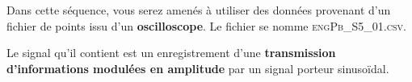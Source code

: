

Dans cette séquence, vous serez amenés à utiliser des données provenant d'un fichier de points issu d'un \textbf{oscilloscope}. Le fichier se nomme \mbox{\textsc{engPb\_S5\_01.csv}}.

Le signal qu'il contient est un enregistrement d'une \textbf{transmission d'informations modulées en amplitude} par un signal porteur sinusoïdal.

\medskip


